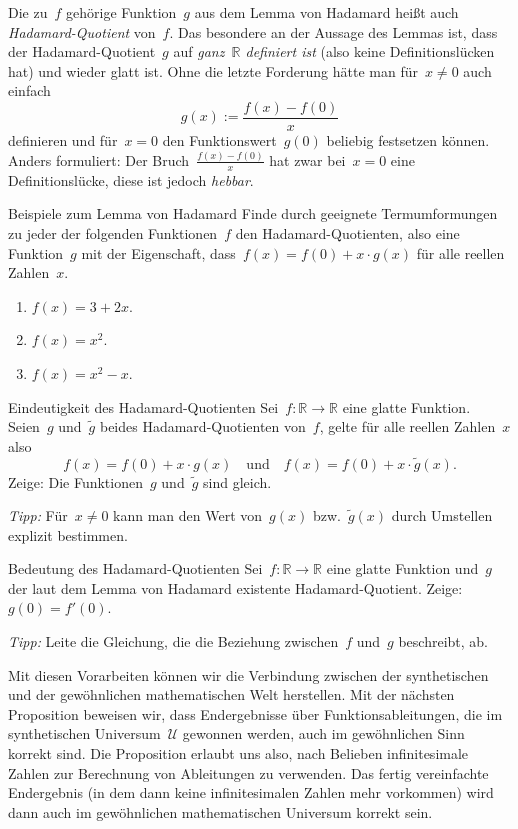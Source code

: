 \documentclass[twoside]{../zirkelblatt}
\newcommand{\RR}{\mathbb{R}}
\newcommand{\U}{\mathcal{U}}
\theoremstyle{definition}
\theoremstyle{plain}
\theoremstyle{remark}
\begin{document}
Die zu~$f$ gehörige Funktion~$g$ aus dem Lemma von Hadamard heißt auch
\emph{Hadamard-Quotient} von~$f$. Das besondere an der Aussage des Lemmas ist,
dass der Hadamard-Quotient~$g$ auf \emph{ganz~$\RR$ definiert ist} (also keine
Definitionslücken hat) und wieder glatt ist. Ohne
die letzte Forderung hätte man für~$x \neq 0$ auch einfach
\[ g(x) := \frac{f(x) - f(0)}{x} \]
definieren und für~$x = 0$ den Funktionswert~$g(0)$ beliebig festsetzen können.
Anders formuliert: Der Bruch~$\frac{f(x) - f(0)}{x}$ hat zwar bei~$x = 0$ eine
Definitionslücke, diese ist jedoch \emph{hebbar}.

\begin{aufgabeShaded}{Beispiele zum Lemma von Hadamard}
Finde durch geeignete Termumformungen zu jeder der folgenden Funktionen~$f$ den
Hadamard-Quotienten, also eine Funktion~$g$ mit der Eigenschaft, dass~$f(x) =
f(0) + x \cdot g(x)$ für alle reellen Zahlen~$x$.
\begin{enumerate}
\item $f(x) = 3 + 2x$.
\item $f(x) = x^2$.
\item $f(x) = x^2 - x$.
\end{enumerate}
\end{aufgabeShaded}

\begin{aufgabeShaded}{Eindeutigkeit des Hadamard-Quotienten}
Sei~$f : \RR \to \RR$ eine glatte Funktion. Seien~$g$ und~$\widetilde g$ beides
Hadamard-Quotienten von~$f$, gelte für alle reellen Zahlen~$x$ also
\[ f(x) = f(0) + x \cdot g(x) \quad\text{und}\quad f(x) = f(0) + x \cdot \widetilde g(x). \]
Zeige: Die Funktionen~$g$ und~$\widetilde g$ sind gleich.

\emph{Tipp:} Für~$x \neq 0$ kann man den Wert von~$g(x)$ bzw.~$\widetilde g(x)$
durch Umstellen explizit bestimmen.
\end{aufgabeShaded}

\begin{aufgabeShaded}{Bedeutung des Hadamard-Quotienten}
\label{aufg:bedeutung-hadamard}
Sei~$f : \RR \to \RR$ eine glatte Funktion und~$g$ der laut dem
Lemma von Hadamard existente Hadamard-Quotient. Zeige: $g(0) = f'(0)$.

\emph{Tipp:} Leite die Gleichung, die die Beziehung zwischen~$f$
und~$g$ beschreibt, ab.
\end{aufgabeShaded}

Mit diesen Vorarbeiten können wir die Verbindung zwischen der synthetischen und
der gewöhnlichen mathematischen Welt herstellen. Mit der nächsten Proposition
beweisen wir, dass Endergebnisse über Funktionsableitungen, die im
synthetischen Universum~$\U$ gewonnen werden, auch im gewöhnlichen Sinn korrekt
sind. Die Proposition erlaubt uns also, nach Belieben infinitesimale Zahlen zur
Berechnung von Ableitungen zu verwenden. Das fertig vereinfachte Endergebnis
(in dem dann keine infinitesimalen Zahlen mehr vorkommen) wird dann auch im
gewöhnlichen mathematischen Universum korrekt sein.
\end{document}

